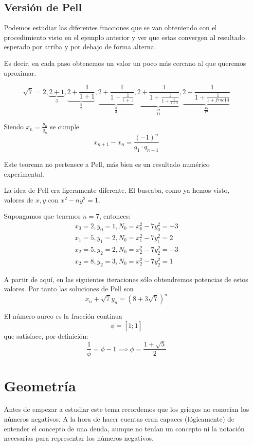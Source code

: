 \documentclass{apuntes}
\begin{document}
\section{Versión de Pell}
Podemos estudiar las diferentes fracciones que se van obteniendo con el procedimiento visto en el ejemplo anterior y ver que estas convergen al resultado esperado por arriba y por debajo de forma alterna.

Es decir, en cada paso obtenemos un valor un poco más cercano al que queremos aproximar.

\[\sqrt{7} = 2, \underbrace{2+1}_{3}, \underbrace{2+\frac{1}{1+1}}_{\frac{5}{2}}, \underbrace{2+\frac{1}{1+\frac{1}{1+1}}}_{\frac{8}{3}},  \underbrace{2+\frac{1}{1+\frac{1}{1+\frac{1}{1+1}}}}_{\frac{37}{14}},  \underbrace{2+\frac{1}{1+\frac{1}{1+frac{1}{4}}}}_{\frac{45}{17}}\]

\begin{theorem}
Siendo $x_n = \frac{p_n}{q_n}$ se cumple
\[x_{n+1}-x_n = \frac{(-1)^n}{q_1 \cdot q_{n+1}}\]
\end{theorem}

Este teorema no pertenece a Pell, más bien es un resultado numérico experimental.

La idea de Pell era ligeramente diferente. El buscaba, como ya hemos visto, valores de $x,y$ con $x^2-ny^2 = 1$.

Supongamos que tenemos $n=7$, entonces:
\[\begin{array}{l}
x_0=2, y_0 =1, N_0 = x_0^2-7y_0^2 = -3 \\
x_1=5, y_1 =2, N_0 = x_1^2-7y_1^2 = 2 \\
x_2=5, y_2 =2, N_0 = x_2^2-7y_2^2 = -3 \\
x_2=8, y_2 =3, N_0 = x_2^2-7y_2^2 = 1
\end{array}\]

A partir de aquí, en las siguientes iteraciones sólo obtendremos potencias de estos valores. Por tanto las soluciones de Pell son
\[x_n + \sqrt{7}y_n = \left(8 + 3 \sqrt{7}\right)^n\]

\begin{defn}
El número aureo es la fracción continua
\[\phi=[1;\overline{1}]\]
que satisface, por definición:
\[\frac{1}{\phi} = \phi -1 \implies \phi = \frac{1+\sqrt{5}}{2}\]
\end{defn}

\chapter{Geometría}
Antes de empezar a estudiar este tema recordemos que los griegos no conocían los números negativos. A la hora de hacer cuentas eran capaces (lógicamente) de entender el concepto de una deuda, aunque no tenían un concepto ni la notación necesarias para representar los números negativos.
\end{document}
